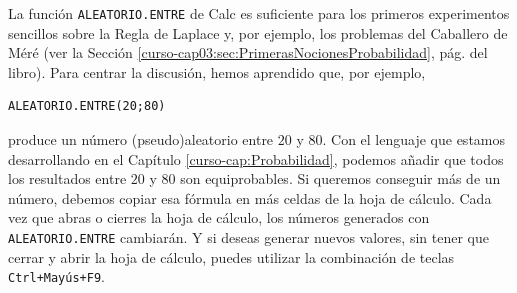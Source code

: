 \documentclass[10pt,a4paper]{article}\usepackage[]{graphicx}\usepackage[]{color}
\begin{document}
La función {\tt ALEATORIO.ENTRE} de Calc es suficiente para los primeros experimentos sencillos sobre la Regla de Laplace y, por ejemplo, los problemas del Caballero de Méré (ver la Sección \ref{curso-cap03:sec:PrimerasNocionesProbabilidad}, pág. \pageref{curso-cap03:sec:PrimerasNocionesProbabilidad} del libro). Para centrar la discusión, hemos aprendido que, por ejemplo,
\begin{verbatim}
ALEATORIO.ENTRE(20;80)
\end{verbatim}
produce un número (pseudo)aleatorio entre $20$ y $80$. Con el lenguaje que estamos desarrollando en el Capítulo \ref{curso-cap:Probabilidad}, podemos añadir que todos los resultados entre $20$ y $80$ son equiprobables. Si queremos conseguir más de un número, debemos copiar esa fórmula en más celdas de la hoja de cálculo. Cada vez que abras o cierres la hoja de cálculo, los números generados con  {\tt ALEATORIO.ENTRE} cambiarán. Y si deseas generar nuevos valores, sin tener que cerrar y abrir la hoja de cálculo, puedes utilizar la combinación de teclas {\tt Ctrl+Mayús+F9}.
\end{document}
